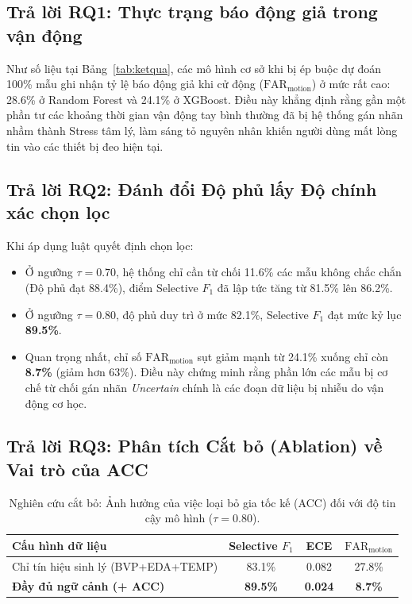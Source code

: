 \documentclass[conference]{IEEEtran}
\begin{document}
\subsection{Trả lời RQ1: Thực trạng báo động giả trong vận động}
Như số liệu tại Bảng~\ref{tab:ketqua}, các mô hình cơ sở khi bị ép buộc dự đoán 100\% mẫu ghi nhận tỷ lệ báo động giả khi cử động ($\text{FAR}_{\text{motion}}$) ở mức rất cao: 28.6\% ở Random Forest và 24.1\% ở XGBoost. Điều này khẳng định rằng gần một phần tư các khoảng thời gian vận động tay bình thường đã bị hệ thống gán nhãn nhầm thành Stress tâm lý, làm sáng tỏ nguyên nhân khiến người dùng mất lòng tin vào các thiết bị đeo hiện tại.

\subsection{Trả lời RQ2: Đánh đổi Độ phủ lấy Độ chính xác chọn lọc}
Khi áp dụng luật quyết định chọn lọc:
\begin{itemize}
    \item Ở ngưỡng $\tau = 0.70$, hệ thống chỉ cần từ chối 11.6\% các mẫu không chắc chắn (Độ phủ đạt 88.4\%), điểm Selective $F_1$ đã lập tức tăng từ 81.5\% lên 86.2\%.
    \item Ở ngưỡng $\tau = 0.80$, độ phủ duy trì ở mức 82.1\%, Selective $F_1$ đạt mức kỷ lục \textbf{89.5\%}.
    \item Quan trọng nhất, chỉ số $\text{FAR}_{\text{motion}}$ sụt giảm mạnh từ 24.1\% xuống chỉ còn \textbf{8.7\%} (giảm hơn 63\%). Điều này chứng minh rằng phần lớn các mẫu bị cơ chế từ chối gán nhãn \textit{Uncertain} chính là các đoạn dữ liệu bị nhiễu do vận động cơ học.
\end{itemize}

\subsection{Trả lời RQ3: Phân tích Cắt bỏ (Ablation) về Vai trò của ACC}
\begin{table}[htbp]
\caption{Nghiên cứu cắt bỏ: Ảnh hưởng của việc loại bỏ gia tốc kế (ACC) đối với độ tin cậy mô hình ($\tau = 0.80$).}
\label{tab:ablation}
\centering
\begin{tabular}{lccc}
\toprule
\textbf{Cấu hình dữ liệu} & \textbf{Selective $F_1$} & \textbf{ECE} & $\text{FAR}_{\text{motion}}$ \\
\midrule
Chỉ tín hiệu sinh lý (BVP+EDA+TEMP) & 83.1\% & 0.082 & 27.8\% \\
\textbf{Đầy đủ ngữ cảnh (+ ACC)}    & \textbf{89.5\%} & \textbf{0.024} & \textbf{8.7\%} \\
\bottomrule
\end{tabular}
\end{table}
\end{document}
